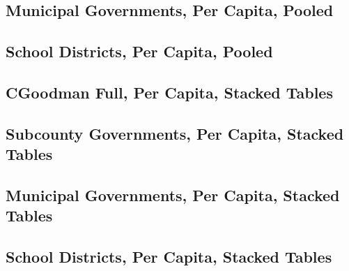 \documentclass{article}
\begin{document}
{	
	\subsection{Municipal Governments, Per Capita, Pooled}
	
	
	\clearpage
	
	\clearpage
	
	\subsection{School Districts, Per Capita, Pooled}
	
	
	\clearpage
	
	\clearpage

	
	
	\subsection{CGoodman Full, Per Capita, Stacked Tables}
	
	
	\clearpage
	
	\clearpage
	
	
	
	\subsection{Subcounty Governments, Per Capita, Stacked Tables}
	
	
	\clearpage
	
	\clearpage
	
	
	\subsection{Municipal Governments, Per Capita, Stacked Tables}
	
	
	\clearpage
	
	\clearpage
	
	
	\subsection{School Districts, Per Capita, Stacked Tables}
	
	
	\clearpage
	
}
\end{document}
